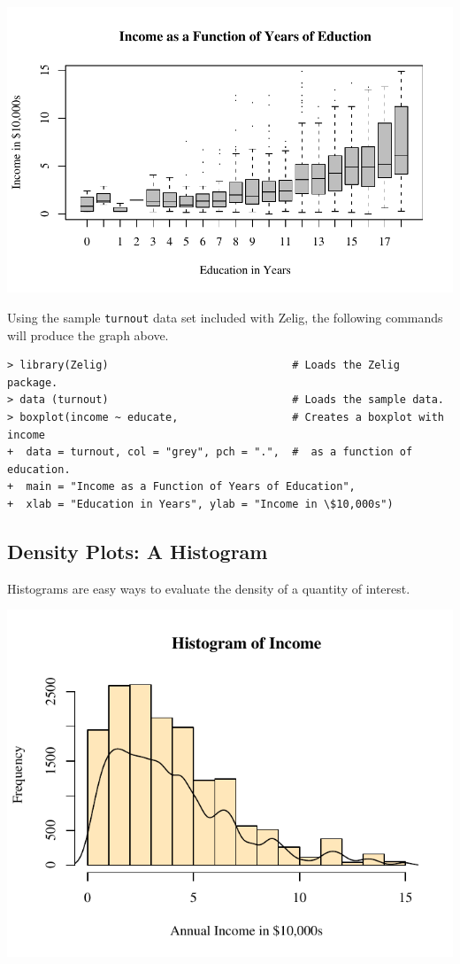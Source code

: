 \begin{center}
\includegraphics{figs/sample1}
\end{center}
Using the sample \texttt{turnout} data set included with Zelig, the
following commands will produce the graph above.
\begin{verbatim}
> library(Zelig)                             # Loads the Zelig package.
> data (turnout)                             # Loads the sample data.
> boxplot(income ~ educate,                  # Creates a boxplot with income
+  data = turnout, col = "grey", pch = ".",  #  as a function of education.  
+  main = "Income as a Function of Years of Education", 
+  xlab = "Education in Years", ylab = "Income in \$10,000s")
\end{verbatim}

\newpage

\subsection{Density Plots: A Histogram}

Histograms are easy ways to evaluate the density of a quantity of
interest.  

\begin{center}
\includegraphics{figs/sample2}
\end{center}

